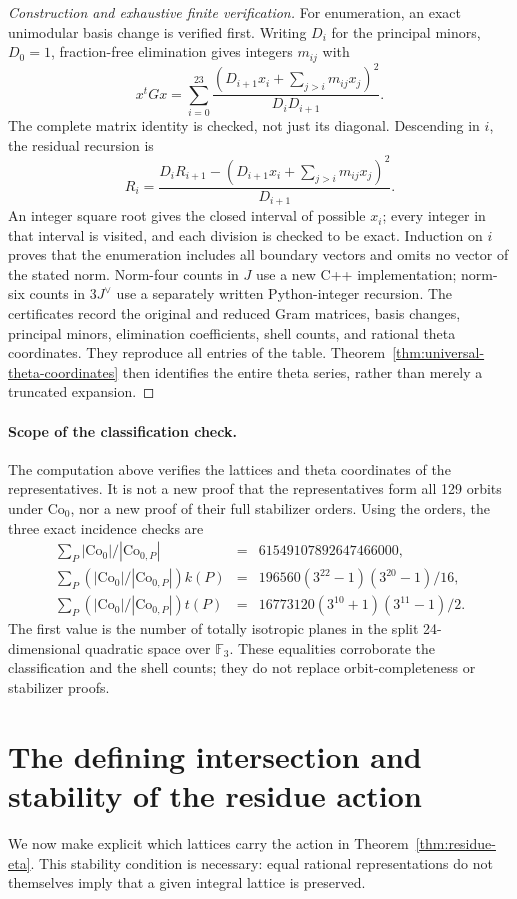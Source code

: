\begin{proof}[Construction and exhaustive finite verification]
For enumeration, an exact unimodular basis change is verified first.
Writing $D_i$ for the principal minors, $D_0=1$, fraction-free
elimination gives integers $m_{ij}$ with
\[
 x^tGx=\sum_{i=0}^{23}
 \frac{(D_{i+1}x_i+\sum_{j>i}m_{ij}x_j)^2}{D_iD_{i+1}}.
\]
The complete matrix identity is checked, not just its diagonal.
Descending in $i$, the residual recursion is
\[
 R_i=\frac{D_iR_{i+1}-(D_{i+1}x_i+
                 \sum_{j>i}m_{ij}x_j)^2}{D_{i+1}}.
\]
An integer square root gives the closed interval of possible $x_i$;
every integer in that interval is visited, and each division is
checked to be exact. Induction on $i$ proves that the enumeration
includes all boundary vectors and omits no vector of the stated norm.
Norm-four counts in $J$ use a new C++ implementation; norm-six counts
in $3J^\vee$ use a separately written Python-integer recursion.
The certificates record the original and reduced Gram matrices,
basis changes, principal minors, elimination coefficients, shell
counts, and rational theta coordinates. They reproduce all entries
of the table. Theorem~\ref{thm:universal-theta-coordinates} then
identifies the entire theta series, rather than merely a truncated
expansion.
\end{proof}

\paragraph{Scope of the classification check.}
The computation above verifies the lattices and theta coordinates of
the representatives. It is not a new proof that the representatives
form all 129 orbits under $\mathrm{Co}_0$, nor a new proof of their
full stabilizer orders. Using the orders, the three exact
incidence checks are
\[
\begin{array}{rcl}
 \sum_P |\mathrm{Co}_0|/|\mathrm{Co}_{0,P}|
   &=&61549107892647466000,\\
 \sum_P (|\mathrm{Co}_0|/|\mathrm{Co}_{0,P}|)k(P)
   &=&196560(3^{22}-1)(3^{20}-1)/16,\\
 \sum_P (|\mathrm{Co}_0|/|\mathrm{Co}_{0,P}|)t(P)
   &=&16773120(3^{10}+1)(3^{11}-1)/2.
\end{array}
\]
The first value is the number of totally isotropic planes in the
split 24-dimensional quadratic space over $\mathbb F_3$. These
equalities corroborate the classification and the shell counts; they do
not replace orbit-completeness or stabilizer proofs.

\section{The defining intersection and stability of the residue action}
We now make explicit which lattices carry the action in
Theorem~\ref{thm:residue-eta}. This stability condition is necessary:
equal rational representations do not themselves imply that a given
integral lattice is preserved.

